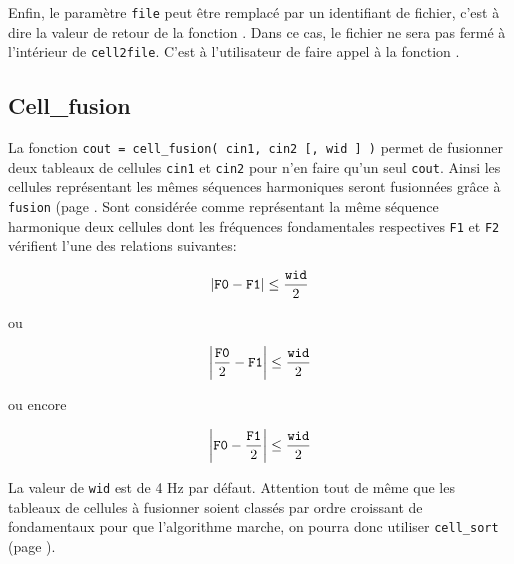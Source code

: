     Enfin, le param{\`e}tre {\tt file} peut {\^e}tre remplac{\'e} par un
    identifiant de fichier, c'est {\`a} dire la valeur de retour de la
    fonction . Dans ce cas, le fichier ne sera
    pas ferm{\'e} {\`a} l'int{\'e}rieur de {\tt cell2file}. C'est {\`a}
    l'utilisateur de faire appel {\`a} la fonction .


    \newpage
    \subsection{Cell\_fusion}
    \label{cellfusion}
    La fonction {\tt cout = cell\_fusion( cin1, cin2 [, wid ] )}
    permet de fusionner deux tableaux de cellules {\tt cin1} et
    {\tt cin2} pour n'en faire qu'un seul {\tt cout}. Ainsi les cellules
    repr{\'e}sentant les m{\^e}mes s{\'e}quences harmoniques seront fusionn{\'e}es
    gr{\^a}ce {\`a} {\tt fusion} (page \pageref{fusion}.
    Sont consid{\'e}r{\'e}e comme repr{\'e}sentant la
    m{\^e}me s{\'e}quence harmonique deux cellules dont les fr{\'e}quences fondamentales
    respectives {\tt F1} et {\tt F2} v{\'e}rifient l'une des relations
    suivantes:

    $$ \left|{\tt F0}-{\tt F1}\right| \leq \frac{\tt wid}{2} $$
    \begin{center} ou \end{center}
    $$ \left|\frac{\tt F0}{2}-{\tt F1}\right| \leq \frac{\tt wid}{2} $$
    \begin{center} ou encore \end{center}
    $$ \left|{\tt F0}-\frac{\tt F1}{2}\right| \leq \frac{\tt wid}{2} $$

    \bigskip
    La valeur de {\tt wid} est de 4 Hz par d{\'e}faut. Attention tout
    de m{\^e}me que les tableaux de cellules {\`a} fusionner soient class{\'e}s
    par ordre croissant de fondamentaux pour que l'algorithme
    marche, on pourra donc utiliser {\tt cell\_sort} (page \pageref{cellsort}).


